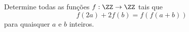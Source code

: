 Determine todas as funções $f : \ZZ \to \ZZ$ tais que
$$f(2a) + 2f(b) = f(f(a + b))$$
para quaisquer $a$ e $b$ inteiros.
